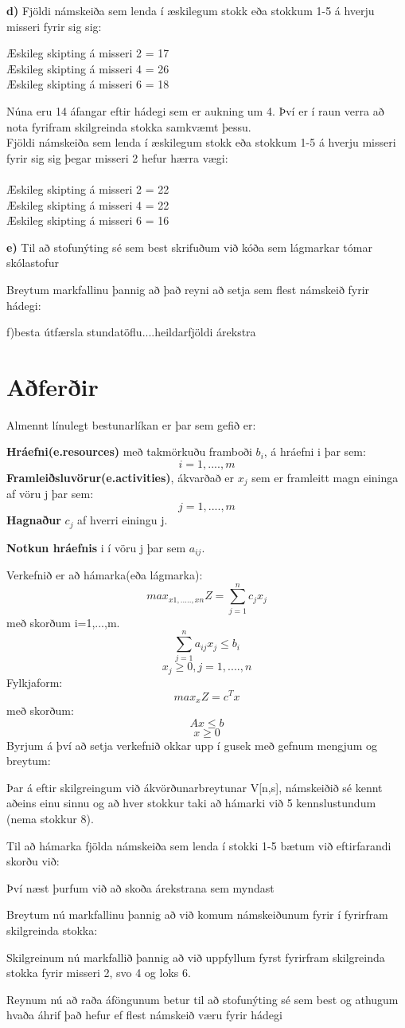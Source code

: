 \documentclass[a4paper,12pt]{article}
\begin{document}
\textbf{d) } Fjöldi námskeiða sem lenda í æskilegum stokk eða stokkum 1-5 á hverju misseri fyrir sig sig:

Æskileg skipting á misseri 2 = 17\\
Æskileg skipting á misseri 4 = 26\\
Æskileg skipting á misseri 6 = 18

Núna eru 14 áfangar eftir hádegi sem er aukning um 4. Því er í raun verra að nota fyrifram skilgreinda stokka samkvæmt þessu.\\

Fjöldi námskeiða sem lenda í æskilegum stokk eða stokkum 1-5 á hverju misseri fyrir sig sig þegar misseri 2 hefur hærra vægi:\\
\\
Æskileg skipting á misseri 2 = 22\\
Æskileg skipting á misseri 4 = 22\\
Æskileg skipting á misseri 6 = 16

\textbf{e) } Til að stofunýting sé sem best skrifuðum við kóða sem lágmarkar tómar skólastofur

Breytum markfallinu þannig að það reyni að setja sem flest námskeið fyrir hádegi:

f)besta útfærsla stundatöflu....heildarfjöldi árekstra

\section{Aðferðir}
Almennt línulegt bestunarlíkan er þar sem gefið er:

\textbf{Hráefni(e.resources)} með takmörkuðu framboði  $b_i$, á hráefni i þar sem:
\[i=1,....,m\]
\textbf{Framleiðsluvörur(e.activities)}, ákvarðað er $x_j$ sem er framleitt magn eininga af vöru j þar sem:
\[j=1,....,m\]
\textbf{Hagnaður} $c_j$ af hverri einingu j. 

\textbf{Notkun hráefnis} i í vöru j þar sem $a_{ij}$.

Verkefnið er að hámarka(eða lágmarka):
\[max_{x1,.....,xn}Z = \sum_{j=1}^{n}c_j x_j\]
með skorðum i=1,...,m.
\[\sum_{j=1}^{n}a_{ij} x_j\leq b_i\]
\[x_j\geq 0, j=1,....,n\]
Fylkjaform:
\[max_xZ=c^Tx\]
með skorðum:
\[Ax\leq b\]
\[x\geq 0\]
Byrjum á því að setja verkefnið okkar upp í gusek með gefnum mengjum og breytum:

Þar á eftir skilgreingum við ákvörðunarbreytunar V[n,s], námskeiðið sé kennt aðeins einu sinnu og að 
hver stokkur taki að hámarki við 5 kennslustundum (nema stokkur 8).


Til að hámarka fjölda námskeiða sem lenda í stokki 1-5 bætum við eftirfarandi skorðu við:

Því næst þurfum við að skoða árekstrana sem myndast

Breytum nú markfallinu þannig að við komum námskeiðunum fyrir í fyrirfram skilgreinda stokka:

Skilgreinum nú markfallið þannig að við uppfyllum fyrst fyrirfram skilgreinda stokka fyrir misseri 2, svo 4 og loks 6.

Reynum nú að raða áföngunum betur til að stofunýting sé sem best og athugum hvaða áhrif það hefur ef flest námskeið væru fyrir hádegi

\end{document}
